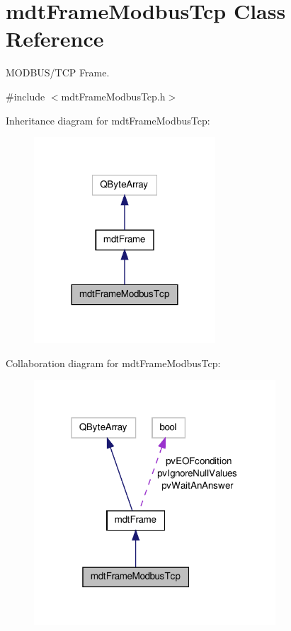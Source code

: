 \hypertarget{classmdt_frame_modbus_tcp}{\section{mdt\-Frame\-Modbus\-Tcp Class Reference}
\label{classmdt_frame_modbus_tcp}
}


M\-O\-D\-B\-U\-S/\-T\-C\-P Frame.  




{\ttfamily \#include $<$mdt\-Frame\-Modbus\-Tcp.\-h$>$}



Inheritance diagram for mdt\-Frame\-Modbus\-Tcp\-:
\nopagebreak
\begin{figure}[H]
\begin{center}
\leavevmode
\includegraphics[width=192pt]{classmdt_frame_modbus_tcp__inherit__graph}
\end{center}
\end{figure}


Collaboration diagram for mdt\-Frame\-Modbus\-Tcp\-:
\nopagebreak
\begin{figure}[H]
\begin{center}
\leavevmode
\includegraphics[width=256pt]{classmdt_frame_modbus_tcp__coll__graph}
\end{center}
\end{figure}
